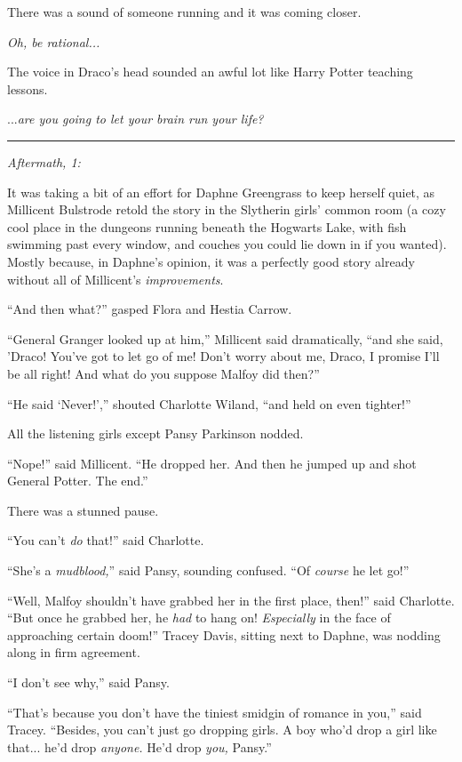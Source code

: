 There was a sound of someone running and it was coming closer.

\emph{Oh, be rational...}

The voice in Draco's head sounded an awful lot like Harry Potter teaching lessons.

...\emph{are you going to let your brain run your life?}

\begin{center}\rule{3in}{0.4pt}\end{center}

\emph{Aftermath, 1:}

It was taking a bit of an effort for Daphne Greengrass to keep herself quiet, as Millicent Bulstrode retold the story in the Slytherin girls' common room (a cozy cool place in the dungeons running beneath the Hogwarts Lake, with fish swimming past every window, and couches you could lie down in if you wanted). Mostly because, in Daphne's opinion, it was a perfectly good story already without all of Millicent's \emph{improvements}.

``And then what?'' gasped Flora and Hestia Carrow.

``General Granger looked up at him,'' Millicent said dramatically, ``and she said, 'Draco! You've got to let go of me! Don't worry about me, Draco, I promise I'll be all right! And what do you suppose Malfoy did then?''

``He said `Never!','' shouted Charlotte Wiland, ``and held on even tighter!''

All the listening girls except Pansy Parkinson nodded.

``Nope!'' said Millicent. ``He dropped her. And then he jumped up and shot General Potter. The end.''

There was a stunned pause.

``You can't \emph{do} that!'' said Charlotte.

``She's a \emph{mudblood,}'' said Pansy, sounding confused. ``Of \emph{course} he let go!''

``Well, Malfoy shouldn't have grabbed her in the first place, then!'' said Charlotte. ``But once he grabbed her, he \emph{had} to hang on! \emph{Especially} in the face of approaching certain doom!'' Tracey Davis, sitting next to Daphne, was nodding along in firm agreement.

``I don't see why,'' said Pansy.

``That's because you don't have the tiniest smidgin of romance in you,'' said Tracey. ``Besides, you can't just go dropping girls. A boy who'd drop a girl like that... he'd drop \emph{anyone.} He'd drop \emph{you,} Pansy.''


